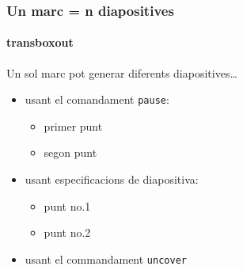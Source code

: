 \documentclass{beamer}
\begin{document}
\begin{frame}
  \frametitle{Un marc = n diapositives}
  \framesubtitle{transboxout}

  Un sol marc pot generar diferents diapositives\dots
  \begin{itemize}
  \item usant el comandament \texttt{pause}:
    \begin{itemize}
    \item
      primer punt
      \pause
    \item    
      segon punt
    \end{itemize}
  \item
    usant especificacions de diapositiva:
    \begin{itemize}
    \item<3->
      punt no.1
    \item<4->
      punt no.2
    \end{itemize}
  \item
    usant el commandament \texttt{uncover}
    \begin{itemize}
    \end{itemize}
  \end{itemize}
  \transboxout
  
\end{frame}
\end{document}
